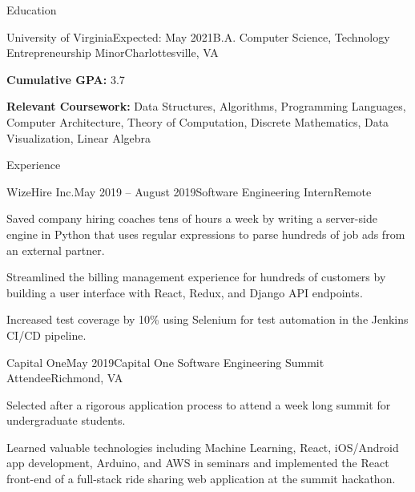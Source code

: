 \documentclass{resume}
\begin{document}
\vspace{-1em}
\begin{rSection}{Education}

  \begin{rSubsection}{University of Virginia}{Expected: May 2021}{B.A. Computer Science, Technology Entrepreneurship Minor}{Charlottesville, VA}
    \item \textbf{Cumulative GPA:} 3.7
    \item \textbf{Relevant Coursework:} Data Structures, Algorithms, Programming Languages, Computer Architecture, Theory of Computation, Discrete Mathematics, Data Visualization, Linear Algebra
  \end{rSubsection}

\end{rSection}

\begin{rSection}{Experience}

  \begin{rSubsection}{WizeHire Inc.}{May 2019 -- August 2019}{Software Engineering Intern}{Remote}
    \item Saved company hiring coaches tens of hours a week by writing a server-side engine in Python that uses regular expressions to parse hundreds of job ads from an external partner.
    \item Streamlined the billing management experience for hundreds of customers by building a user interface with React, Redux, and Django API endpoints.
    \item Increased test coverage by 10\% using Selenium for test automation in the Jenkins CI/CD pipeline.
  \end{rSubsection}

  \begin{rSubsection}{Capital One}{May 2019}{Capital One Software Engineering Summit Attendee}{Richmond, VA}
    \item Selected after a rigorous application process to attend a week long summit for undergraduate students.
    \item Learned valuable technologies including Machine Learning, React, iOS/Android app development, Arduino, and AWS in seminars and implemented the React front-end of a full-stack ride sharing web application at the summit hackathon.
  \end{rSubsection}


\end{rSection}
\end{document}
